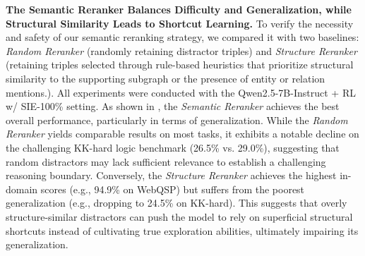 \documentclass{article} %
\begin{document}
\textbf{The Semantic Reranker Balances Difficulty and Generalization, while Structural Similarity Leads to Shortcut Learning.}
To verify the necessity and safety of our semantic reranking strategy, we compared it with two baselines: \textit{Random Reranker} (randomly retaining distractor triples) and \textit{Structure Reranker} (retaining triples selected through rule-based heuristics that prioritize structural similarity to the supporting subgraph or the presence of entity or relation mentions.). All experiments were conducted with the Qwen2.5-7B-Instruct + RL w/ SIE-100\% setting.
As shown in , the \textit{Semantic Reranker} achieves the best overall performance, particularly in terms of generalization.
While the \textit{Random Reranker} yields comparable results on most tasks, it exhibits a notable decline on the challenging KK-hard logic benchmark (26.5\% vs. 29.0\%), suggesting that random distractors may lack sufficient relevance to establish a challenging reasoning boundary.
Conversely, the \textit{Structure Reranker} achieves the highest in-domain scores (e.g., 94.9\% on WebQSP) but suffers from the poorest generalization (e.g., dropping to 24.5\% on KK-hard). This suggests that overly structure-similar distractors can push the model to rely on superficial structural shortcuts instead of cultivating true exploration abilities, ultimately impairing its generalization.


\begin{table}[!t]
\centering
\caption{Ablation study on different reranking strategies for distractor subgraphs. The semantic reranker provides the optimal trade-off between in-domain performance and OOD generalization.}
\vspace{5pt}
\label{tab:reranker_ablation}
\end{table}
\end{document}

